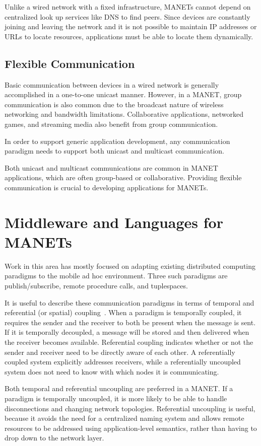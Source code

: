 Unlike a wired network with a fixed infrastructure, MANETs cannot depend on centralized look up services like DNS to find peers. Since devices are constantly joining and leaving the network and it is not possible to maintain IP addresses or URLs to locate resources, applications must be able to locate them dynamically.

\subsection{Flexible Communication}

Basic communication between devices in a wired network is generally accomplished in a one-to-one unicast manner. However, in a MANET, group communication is also common due to the broadcast nature of wireless networking and bandwidth limitations. Collaborative applications, networked games, and streaming media also benefit from group communication.

In order to support generic application development, any communication paradigm needs to support both unicast and multicast communication.

Both unicast and multicast communications are common in MANET applications, which are often group-based or collaborative. Providing flexible communication is crucial to developing applications for MANETs.

\section{Middleware and Languages for MANETs}

Work in this area has mostly focused on adapting existing distributed computing paradigms to the mobile ad hoc environment. Three such paradigms are publish/subscribe, remote procedure calls, and tuplespaces.

It is useful to describe these communication paradigms in terms of temporal and referential (or spatial) coupling~\cite{distbook}. When a paradigm is temporally coupled, it requires the sender and the receiver to both be present when the message is sent. If it is temporally decoupled, a message will be stored and then delivered when the receiver becomes available. Referential coupling indicates whether or not the sender and receiver need to be directly aware of each other. A referentially coupled system explicitly addresses receivers, while a referentially uncoupled system does not need to know with which nodes it is communicating. 

Both temporal and referential uncoupling are preferred in a MANET. If a paradigm is temporally uncoupled, it is more likely to be able to handle disconnections and changing network topologies. Referential uncoupling is useful, because it avoids the need for a centralized naming system and allows remote resources to be addressed using application-level semantics, rather than having to drop down to the network layer.

